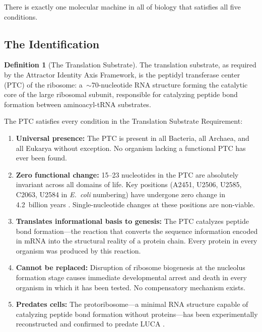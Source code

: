 \documentclass[11pt]{article}
\theoremstyle{definition}
\newtheorem{definition}{Definition}[section]
\begin{document}
There is exactly one molecular machine in all of biology that
satisfies all five conditions.

\subsection{The Identification}

\begin{definition}[The Translation Substrate]
The translation substrate, as required by the Attractor Identity Axis
Framework, is the peptidyl transferase center (PTC) of the ribosome:
a~$\sim$70-nucleotide RNA structure forming the catalytic core of the
large ribosomal subunit, responsible for catalyzing peptide bond
formation between aminoacyl-tRNA substrates.
\end{definition}

The PTC satisfies every condition in the Translation Substrate
Requirement:

\begin{enumerate}
    \item \textbf{Universal presence:} The PTC is present in all
    Bacteria, all Archaea, and all Eukarya without exception.
    No organism lacking a functional PTC has ever been found.

    \item \textbf{Zero functional change:} 15--23 nucleotides in
    the PTC are absolutely invariant across all domains of life.
    Key positions (A2451, U2506, U2585, C2063, U2584 in
    \textit{E.~coli} numbering) have undergone zero change in
    4.2~billion years \cite{Nobel2009,Yonath2024}.
    Single-nucleotide changes at these positions are non-viable.

    \item \textbf{Translates informational basis to genesis:}
    The PTC catalyzes peptide bond formation---the reaction
    that converts the sequence information encoded in mRNA
    into the structural reality of a protein chain.
    Every protein in every organism was produced by this reaction.

    \item \textbf{Cannot be replaced:} Disruption of ribosome
    biogenesis at the nucleolus formation stage causes immediate
    developmental arrest and death in every organism in which it
    has been tested. No compensatory mechanism exists.

    \item \textbf{Predates cells:} The protoribosome---a minimal
    RNA structure capable of catalyzing peptide bond formation
    without proteins---has been experimentally reconstructed and
    confirmed to predate LUCA \cite{Yonath2024,PNASNexus2025}.
\end{enumerate}
\end{document}
